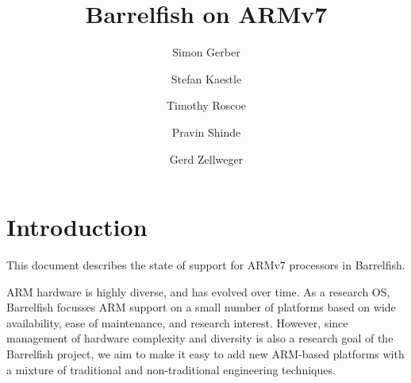 \documentclass[a4paper,twoside]{report} %
\title{Barrelfish on ARMv7}   %
\author{Simon Gerber \and Stefan Kaestle \and Timothy Roscoe \and
  Pravin Shinde \and Gerd Zellweger}
\begin{document}
\maketitle

\newcommand{\code}[1]{{\lstinline!#1!}}
\newcommand{\file}[1]{{\lstinline!#1!}}

\lstset{%
  basicstyle=\small\ttfamily,
  escapechar=@
}

\newcommand{\shell}{\$}
\newcommand{\home}{\$HOME}

\newcommand{\stefan}[1]{%
  {\color{red}[{\color{red}{SK}} #1]}}

\newcommand{\gerd}[1]{%
  {\color{red}[{\color{red}{GZ}} #1]}}

\newcommand{\simon}[1]{%
  {\color{red}[{\color{red}{SG}} #1]}}

\newcommand{\pravin}[1]{%
  {\color{red}[{\color{red}{PS}} #1]}}


%
%
\begin{versionhistory}
\end{versionhistory}

\tableofcontents		%


\newcommand{\eclipse}{ECL\textsuperscript{i}PS\textsuperscript{e}\xspace}
\newcommand{\codesize}{\scriptsize}
\newcommand{\note}[1]{[\textcolor{red}{\emph{#1}}]}

\chapter{Introduction}

This document describes the state of support for ARMv7 processors
in Barrelfish.

ARM hardware is highly diverse, and has evolved over time.  As a
research OS, Barrelfish focusses ARM support on a small number of
platforms based on wide availability, ease of maintenance, and
research interest.   However, since management of hardware complexity
and diversity is also a research goal of the Barrelfish project, we
aim to make it easy to add new ARM-based platforms with a mixture of
traditional and non-traditional engineering techniques. 
\end{document}
